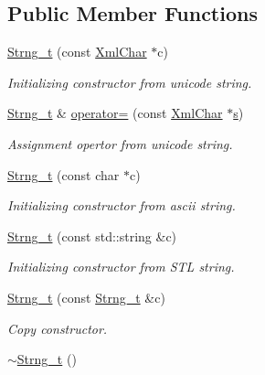 \subsection*{Public Member Functions}
\begin{DoxyCompactItemize}
\item 
\hyperlink{class_d_d4hep_1_1_x_m_l_1_1_strng__t_a172f140c427ae76165669b5822588e6e}{Strng\+\_\+t} (const \hyperlink{namespace_d_d4hep_1_1_x_m_l_a09e5d9cc86ed782f6826dfe0778c1815}{Xml\+Char} $\ast$c)
\begin{DoxyCompactList}\small\item\em Initializing constructor from unicode string. \end{DoxyCompactList}\item 
\hyperlink{class_d_d4hep_1_1_x_m_l_1_1_strng__t}{Strng\+\_\+t} \& \hyperlink{class_d_d4hep_1_1_x_m_l_1_1_strng__t_a9d28b473f29f5cb66de040207fd38e54}{operator=} (const \hyperlink{namespace_d_d4hep_1_1_x_m_l_a09e5d9cc86ed782f6826dfe0778c1815}{Xml\+Char} $\ast$\hyperlink{_volumes_8cpp_a17ca6bfc8040d695d3cada22a4763d40}{s})
\begin{DoxyCompactList}\small\item\em Assignment opertor from unicode string. \end{DoxyCompactList}\item 
\hyperlink{class_d_d4hep_1_1_x_m_l_1_1_strng__t_ac846845ea068229d358849a6be38481e}{Strng\+\_\+t} (const char $\ast$c)
\begin{DoxyCompactList}\small\item\em Initializing constructor from ascii string. \end{DoxyCompactList}\item 
\hyperlink{class_d_d4hep_1_1_x_m_l_1_1_strng__t_a494da46642509d83375a96a6ce725ad4}{Strng\+\_\+t} (const std\+::string \&c)
\begin{DoxyCompactList}\small\item\em Initializing constructor from S\+TL string. \end{DoxyCompactList}\item 
\hyperlink{class_d_d4hep_1_1_x_m_l_1_1_strng__t_a44f256b1244bd55f56668be6df3550c9}{Strng\+\_\+t} (const \hyperlink{class_d_d4hep_1_1_x_m_l_1_1_strng__t}{Strng\+\_\+t} \&c)
\begin{DoxyCompactList}\small\item\em Copy constructor. \end{DoxyCompactList}\item 
\hyperlink{class_d_d4hep_1_1_x_m_l_1_1_strng__t_a0538fed420113f555a2f8ec389b131df}{$\sim$\+Strng\+\_\+t} ()

\end{DoxyCompactItemize}
